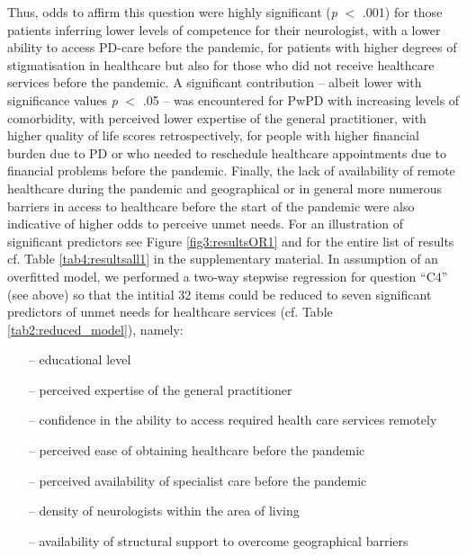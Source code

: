 \documentclass[a4paper,oneside,11pt,english]{scrartcl}
\begin{document}
Thus, odds to affirm this question were highly significant (\textit{p} $<$ .001) for those patients inferring lower levels of competence for their neurologist, with a lower ability to access \textsc{PD}-care before the pandemic, for patients with higher degrees of stigmatisation in healthcare but also for those who did not receive healthcare services before the pandemic. A significant contribution -- albeit lower with significance values \textit{p} $<$ .05 --  was encountered for Pw\textsc{PD} with increasing levels of comorbidity, with perceived lower expertise of the general practitioner, with higher quality of life scores retrospectively, for people with higher financial burden due to \textsc{PD} or who needed to reschedule healthcare appointments due to financial problems before the pandemic. Finally, the lack of availability of remote healthcare during the pandemic and geographical or in general more numerous barriers in access to healthcare before the start of the pandemic were also indicative of higher odds to perceive unmet needs. For an illustration of significant predictors see Figure \ref{fig3:resultsOR1} and for the entire list of results cf. Table \ref{tab4:resultsall1} in the supplementary material. In assumption of an overfitted model, we performed a two-way stepwise regression for question ``C4'' (see above) so that the intitial 32 items could be reduced to seven significant predictors of unmet needs for healthcare services (cf. Table \ref{tab2:reduced_model}), namely: 
\begin{itemize}
	\item[--] educational level
	\item[--] perceived expertise of the general practitioner
	\item[--] confidence in the ability to access required health care services remotely
	\item[--] perceived ease of obtaining healthcare before the pandemic
	\item[--] perceived availability of specialist care before the pandemic
	\item[--] density of neurologists within the area of living
	\item[--] availability of structural support to overcome geographical barriers
\end{itemize}
\end{document}
